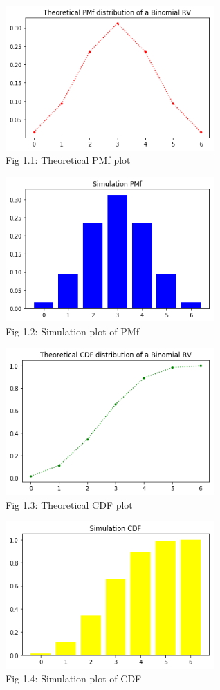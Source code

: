 \documentclass[journal,12pt,twocolumn]{IEEEtran}
\begin{document}
\begin{figure}[h!]
    \includegraphics[width=8cm]{Assignment-4/Codes/Figures/theo_pmf.png}
    \caption*{Fig 1.1: Theoretical PMf plot}
\end{figure}
\begin{figure}[h!]
    \includegraphics[width=8cm]{Assignment-4/Codes/Figures/sim_pmf.png}
    \caption*{Fig 1.2: Simulation plot of PMf}
\end{figure}
\begin{figure}[h!]
    \includegraphics[width=8cm]{Assignment-4/Codes/Figures/theo_cdf.png}
    \caption*{Fig 1.3: Theoretical CDF plot}
\end{figure}
\begin{figure}[h!]
    \includegraphics[width=8cm]{Assignment-4/Codes/Figures/sim_cdf.png}
    \caption*{Fig 1.4: Simulation plot of CDF}
\end{figure}
\end{document}
